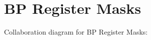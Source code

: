 \hypertarget{group___b_p___register___masks}{}\section{BP Register Masks}
\label{group___b_p___register___masks}
Collaboration diagram for BP Register Masks\+:
